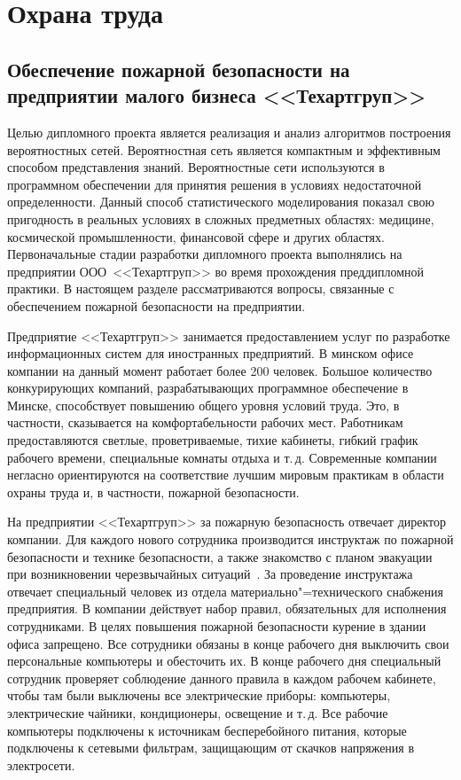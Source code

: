 \newcommand{\companyname}{\mbox{<<Техартгруп>>}}

\section{Охрана труда}

\subsection[Обеспечение пожарной безопасности на предприятии]{Обеспечение пожарной безопасности на предприятии малого бизнеса \companyname{}}


Целью дипломного проекта является реализация и анализ алгоритмов построения вероятностных сетей.
Вероятностная сеть является компактным и эффективным способом представления знаний.
Вероятностные сети используются в программном обеспечении для принятия решения в условиях недостаточной определенности.
Данный способ статистического моделирования показал свою пригодность в реальных условиях в сложных предметных областях: медицине, космической промышленности, финансовой сфере и других областях.
Первоначальные стадии разработки дипломного проекта выполнялись на предприятии ООО~\companyname{} во время прохождения преддипломной практики.
В настоящем разделе рассматриваются вопросы, связанные с обеспечением пожарной безопасности на предприятии.

Предприятие \companyname{} занимается предоставлением услуг по разработке информационных систем для иностранных предприятий. 
В минском офисе компании на данный момент работает более 200 человек. 
Большое количество конкурирующих компаний, разрабатывающих программное обеспечение в Минске, способствует повышению общего уровня условий труда.
Это, в частности, сказывается на комфортабельности рабочих мест.
Работникам предоставляются светлые, проветриваемые, тихие кабинеты, гибкий график рабочего времени, специальные комнаты отдыха и т.\,д.
Современные компании негласно ориентируются на соответствие лучшим мировым практикам в области охраны труда и, в частности, пожарной безопасности.

На предприятии \companyname{} за пожарную безопасность отвечает директор компании.
Для каждого нового сотрудника производится инструктаж по пожарной безопасности и технике безопасности, а также знакомство с планом эвакуации при возникновении черезвычайных ситуаций~\cite[\ignore{раздел~5.5.8,} с.~324]{michnuk_2009}.
За проведение инструктажа отвечает специальный человек из отдела материально"=технического снабжения предприятия.
В компании действует набор правил, обязательных для исполнения сотрудниками.
В целях повышения пожарной безопасности курение в здании офиса запрещено.
Все сотрудники обязаны в конце рабочего дня выключить свои персональные компьютеры и обесточить их.
В конце рабочего дня специальный сотрудник проверяет соблюдение данного правила в каждом рабочем кабинете, чтобы там были выключены все электрические приборы: компьютеры, электрические чайники, кондиционеры, освещение и т.\,д.
Все рабочие компьютеры подключены к источникам бесперебойного питания, которые подключены к сетевыми фильтрам, защищающим от скачков напряжения в электросети.

